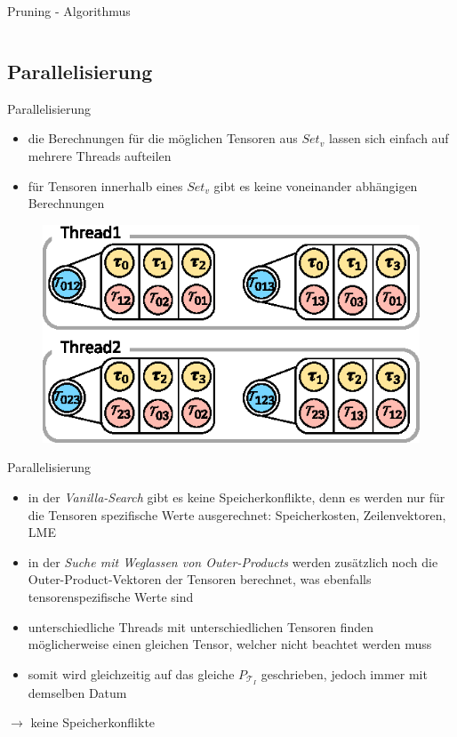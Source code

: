 \documentclass{beamer}
\newcommand{\Tau}{\bm{\mathcal{T}}}
\begin{document}
\begin{frame}{Pruning - Algorithmus}
\begin{columns}
\begin{column}{0.5\textwidth}
		\end{column}
	\end{columns}
\end{frame}
\subsection{Parallelisierung}

\begin{frame}{Parallelisierung}
	\begin{itemize}
		\item die Berechnungen für die möglichen Tensoren aus $Set_v$ lassen sich einfach auf mehrere Threads aufteilen
		\item für Tensoren innerhalb eines $Set_v$ gibt es keine voneinander abhängigen Berechnungen
	\end{itemize}
	\begin{figure}
		\includegraphics{figure_07}
	\end{figure}
\end{frame}

\begin{frame}{Parallelisierung}
	\begin{itemize}
		\item in der \textit{Vanilla-Search} gibt es keine Speicherkonflikte, denn es werden nur für die Tensoren spezifische Werte ausgerechnet: Speicherkosten, Zeilenvektoren, LME \pause
		\item in der \textit{Suche mit Weglassen von Outer-Products} werden zusätzlich noch die Outer-Product-Vektoren der Tensoren berechnet, was ebenfalls tensorenspezifische Werte sind
		\item unterschiedliche Threads mit unterschiedlichen Tensoren finden möglicherweise einen gleichen Tensor, welcher nicht beachtet werden muss
		\item somit wird gleichzeitig auf das gleiche $P_{\Tau_I}$ geschrieben, jedoch immer mit demselben Datum
	\end{itemize} \pause
	$\rightarrow$ keine Speicherkonflikte
\end{frame}
\end{document}
